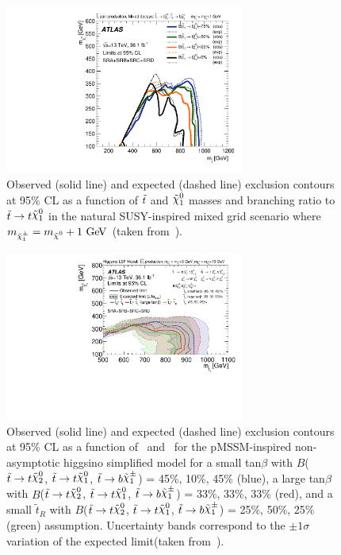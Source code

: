 			\begin{figure}[htpb]
			  \begin{center}
			    \includegraphics[width=0.7\textwidth]{figures/fit/SRABCD_mixed_dm1}
			    \caption{Observed (solid line) and expected (dashed line) exclusion contours at 95\% CL as a function of $\tilde{t}$ and $\ninoone$ masses and branching ratio to $\stop\to t\LSP$ in the natural SUSY-inspired mixed grid scenario where $m_{\chinoonepm}=\mLSP+1\gev$ (taken from~\cite{stop0L}).}
			    \label{fig:tbMet_exclusion}
			  \end{center}
			\end{figure}

			\begin{figure}[htpb]
			  \begin{center}
			   \includegraphics[width=0.7\textwidth]{figures/fit/SRABCD_tN1tN2bC1.pdf}
			    \caption{Observed (solid line) and expected (dashed line) exclusion contours at 95\% CL as a function of \mstop\ and \mLSP\ for the pMSSM-inspired non-asymptotic higgsino simplified model for a small tan$\beta$ with $B$($\stop\to t\ninotwo$, $\stop\to t\LSP$, $\stop\to b\chinoonepm$) = 45\%, 10\%, 45\% (blue), a large tan$\beta$ with $B$($\stop\to t\ninotwo$, $\stop\to t\LSP$, $\stop\to b\chinoonepm$) = 33\%, 33\%, 33\% (red), and a small $\tilde t_{R}$ with $B$($\stop\to t\ninotwo$, $\stop\to t\LSP$, $\stop\to b\chinoonepm$) = 25\%, 50\%, 25\% (green) assumption. Uncertainty bands correspond to the $\pm 1 \sigma$ variation of the expected limit(taken from~\cite{stop0L}).}
			    \label{fig:nonAsymhiggsino_exclusion}
			  \end{center}
			\end{figure}


